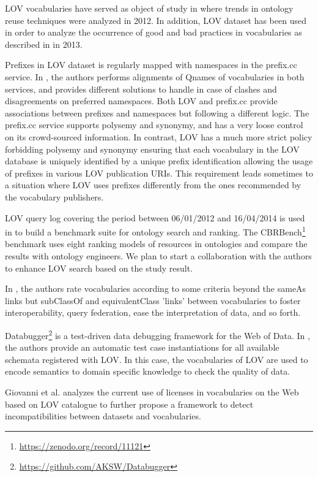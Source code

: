 \documentclass{iosart2c}
\newcommand{\ghis}[1]{\textcolor{brown}{\textbf{[GHIS TO:#1]}}}
\begin{document}
LOV vocabularies have served as object of study in \cite{poveda2012landscape} where trends in ontology reuse techniques were analyzed in 2012. In addition, LOV dataset has been used in order to analyze the occurrence of good and bad practices in vocabularies as described in \cite{poveda2013detecting} in 2013.

Prefixes in LOV dataset is regularly mapped with namespaces in the prefix.cc service. In \cite{wasabi13}, the authors performs alignments of Qnames of vocabularies in both services, and provides different solutions to handle in case of clashes and disagreements on preferred namespaces. Both LOV and prefix.cc provide associations between prefixes and namespaces but following a different logic. The prefix.cc service supports polysemy and synonymy, and has a very loose control on its crowd-sourced information. In contrast, LOV has a much more strict policy forbidding polysemy and synonymy ensuring that each vocabulary in the LOV database is uniquely identified by a unique prefix identification allowing the usage of prefixes in various LOV publication URIs. This requirement leads sometimes to a situation where LOV uses prefixes differently from the ones recommended by the vocabulary publishers.

LOV query log covering the period between 06/01/2012 and 16/04/2014 is used in \cite{butt2014} to build a benchmark suite for ontology search and ranking. The CBRBench\footnote{\url{https://zenodo.org/record/11121}} benchmark uses eight ranking models of resources in ontologies and compare the results with ontology engineers. We plan to start a collaboration with the authors to enhance LOV search based on the study result.

In \cite{janowicz2014five}, the authors rate vocabularies according to some criteria beyond the sameAs links but subClassOf and equivalentClass 'links' between vocabularies to foster interoperability, query federation, ease the interpretation of data, and so forth. %

Databugger\footnote{\url{https://github.com/AKSW/Databugger}} is a test-driven data debugging framework for the Web of Data. In \cite{databugger,rdfunit}, the authors provide an automatic test case instantiations for all available schemata registered with LOV. In this case, the vocabularies of LOV are used to encode semantics to domain specific knowledge to check the quality of data.

Giovanni et al. \cite{governatori2014} analyzes the current use of licenses in vocabularies on the Web based on LOV catalogue to further propose a framework to detect incompatibilities between datasets and vocabularies.
\end{document}
